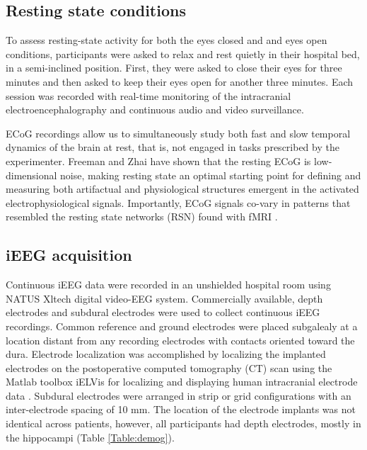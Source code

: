\documentclass[11pt, onecolumn]{article}
\begin{document}
\subsection{Resting state conditions}
To assess resting-state activity for both the eyes closed and and eyes open conditions, participants were asked to relax and rest quietly in their hospital bed, in a semi-inclined position. First, they were asked to close their eyes for three minutes and then asked to keep their eyes open for another three minutes. Each session was recorded with real-time monitoring of the intracranial electroencephalography and continuous audio and video surveillance.

ECoG recordings allow us to simultaneously study both fast and slow temporal dynamics of the brain at rest, that is, not engaged in tasks prescribed by the experimenter.
Freeman and Zhai \citep{freeman2009simulated} have shown that the resting ECoG is low-dimensional noise, making resting state an optimal starting point for defining and measuring both artifactual and physiological structures emergent in the activated electrophysiological signals. Importantly, ECoG signals co-vary in patterns that resembled the resting state networks (RSN) found with fMRI  \citep{fukushima2015studying}.

\subsection{iEEG acquisition}
Continuous iEEG data were recorded in an unshielded hospital room using NATUS Xltech digital video-EEG system.
Commercially available, depth electrodes and subdural electrodes were used to collect continuous iEEG recordings. Common reference and ground electrodes were placed subgalealy at a location distant from any recording electrodes with contacts oriented toward the dura.
Electrode localization was accomplished by localizing the implanted electrodes on the postoperative computed tomography (CT) scan using the   Matlab toolbox iELVis for localizing and displaying human intracranial  electrode data \citep{pmid28192130}.
Subdural electrodes were arranged in strip or grid configurations with an inter-electrode spacing of 10 mm. The location of the electrode implants was not identical across patients, however, all participants had depth  electrodes,  mostly  in the hippocampi   (Table \ref{Table:demog}).
\end{document}
